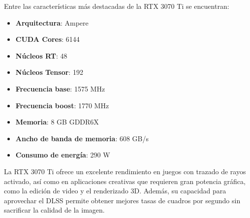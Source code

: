 \documentclass{article}
\begin{document}
Entre las características más destacadas de la RTX 3070 Ti se encuentran:

\begin{itemize}
    \item \textbf{Arquitectura}: Ampere
    \item \textbf{CUDA Cores}: 6144
    \item \textbf{Núcleos RT}: 48
    \item \textbf{Núcleos Tensor}: 192
    \item \textbf{Frecuencia base}: 1575 MHz
    \item \textbf{Frecuencia boost}: 1770 MHz
    \item \textbf{Memoria}: 8 GB GDDR6X
    \item \textbf{Ancho de banda de memoria}: 608 GB/s
    \item \textbf{Consumo de energía}: 290 W
\end{itemize}


La RTX 3070 Ti ofrece un excelente rendimiento en juegos con trazado de rayos activado, así como en aplicaciones creativas que requieren gran potencia gráfica, como la edición de video y el renderizado 3D. Además, su capacidad para aprovechar el DLSS permite obtener mejores tasas de cuadros por segundo sin sacrificar la calidad de la imagen.
\end{document}

